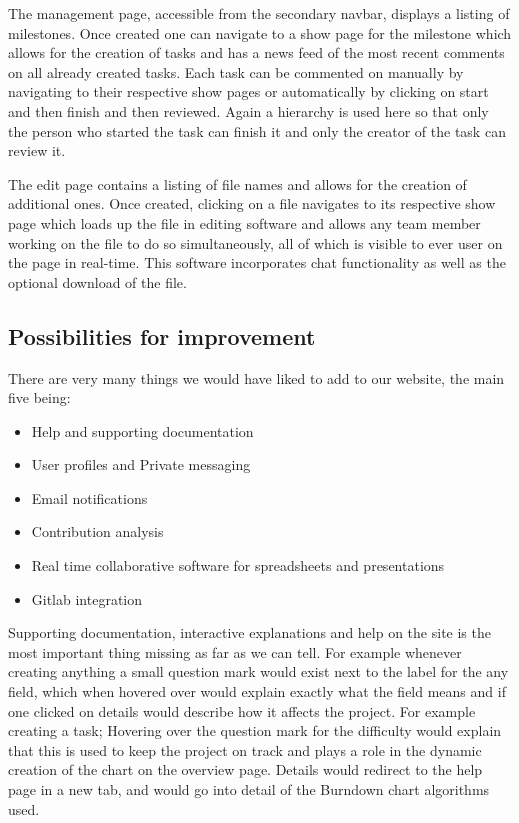 \documentclass[a4wide, 11pt]{article}
\begin{document}
The management page, accessible from the secondary navbar, displays a listing of milestones. Once created one can navigate to a show page for the milestone which allows for the creation of tasks and has a news feed of the most recent comments on all already created tasks. Each task can be commented on manually by navigating to their respective show pages or automatically by clicking on start and then finish and then reviewed. Again a hierarchy is used here so that only the person who started the task can finish it and only the creator of the task can review it.

The edit page contains a listing of file names and allows for the creation of additional ones. Once created, clicking on a file navigates to its respective show page which loads up the file in editing software and allows any team member working on the file to do so simultaneously, all of which is visible to ever user on the page in real-time. This software incorporates chat functionality as well as the optional download of the file. 

\subsection{Possibilities for improvement}
There are very many things we would have liked to add to our website, the main five being:
\begin{itemize}
  \item Help and supporting documentation
  \item User profiles and Private messaging
  \item Email notifications
  \item Contribution analysis
  \item Real time collaborative software for spreadsheets and presentations
  \item Gitlab integration
\end{itemize}

Supporting documentation, interactive explanations and help on the site is the most important thing missing as far as we can tell. For example whenever creating anything a small question mark would exist next to the label for the any field, which when hovered over would explain exactly what the field means and if one clicked on details would describe how it affects the project. For example creating a task; Hovering over the question mark for the difficulty would explain that this is used to keep the project on track and plays a role in the dynamic creation of the chart on the overview page. Details would redirect to the help page in a new tab, and would go into detail of the Burndown chart algorithms used.
\end{document}
